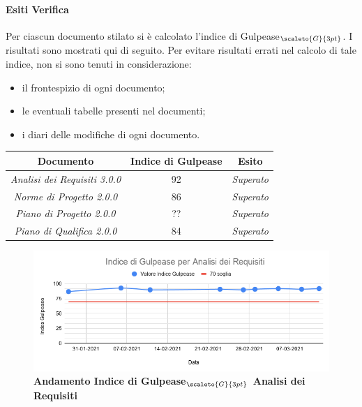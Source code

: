 {{\paragraph{Esiti Verifica} \label{ResocontoAttivitàDiVerificaRevisioneDiProgettazioneVerificheDiProdottoStrategiaPerAnalisiStaticaEsitiVerifica}
Per ciascun documento stilato si è calcolato l’indice di Gulpease$_{\scaleto{G}{3pt}}$. I risultati sono mostrati qui di seguito.
Per evitare risultati errati nel calcolo di tale indice, non si sono tenuti in considerazione:
\begin{itemize}
	\item il frontespizio di ogni documento;
	\item le eventuali tabelle presenti nel documenti;
	\item i diari delle modifiche di ogni documento.
\end{itemize}
\quad
\def\tabularxcolumn#1{m{#1}}
{
	\begin{center}
		\renewcommand{\arraystretch}{1.4}
		\begin{tabularx}{11.50cm}{|c|c|c|}
			\hline
			\rowcolor{airforceblue}
			\textbf{Documento} & \textbf{Indice di Gulpease} & \textbf{Esito}\\
			\hline
			\textit{Analisi dei Requisiti 3.0.0} & 92  & \textit{Superato}\\
			\hline
			\textit{Norme di Progetto 2.0.0} & 86 & \textit{Superato}\\
			\hline
			\textit{Piano di Progetto 2.0.0} & ?? & \textit{Superato}\\
			\hline
			\textit{Piano di Qualifica 2.0.0} & 84 & \textit{Superato}\\
			\hline
		\end{tabularx}
	\end{center}

\begin{figure}[!h]
	\begin{center}
		\includegraphics[width=1\linewidth]{../immagini/gulpeaseRP/IndicediGulpease perAnalisiDeiRequisiti.png}
		\caption{\textbf{Andamento Indice di Gulpease$_{\scaleto{G}{3pt}}$ Analisi dei Requisiti}}
	\end{center}
\end{figure}

}}}
